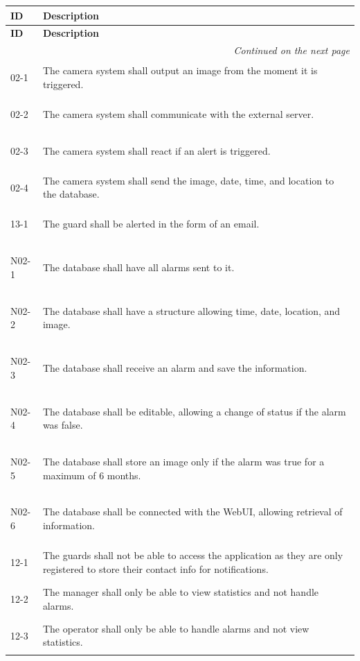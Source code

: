 \documentclass{article}
\begin{document}
\begin{longtable}{|l|p{15cm}|}
\hline
\textbf{ID} & \textbf{Description} \\
\hline
\endfirsthead

\hline
\textbf{ID} & \textbf{Description} \\
\hline
\endhead

\hline \multicolumn{2}{|r|}{\textit{Continued on the next page}} \\
\hline
\endfoot

\hline
\endlastfoot

\hypertarget{02-1}{02-1} & The camera system shall output an image from the moment it is triggered. \\
\hline
\hypertarget{02-2}{02-2} & The camera system shall communicate with the external server. \\
\hline
\hypertarget{02-3}{02-3} & The camera system shall react if an alert is triggered. \\
\hline
\hypertarget{02-4}{02-4} & The camera system shall send the image, date, time, and location to the database. \\
\hline
\hypertarget{13-1}{13-1} & The guard shall be alerted in the form of an email. \\
\hline
\hypertarget{N02-1}{N02-1} & The database shall have all alarms sent to it. \\
\hline
\hypertarget{N02-2}{N02-2} & The database shall have a structure allowing time, date, location, and image. \\
\hline
\hypertarget{N02-3}{N02-3} & The database shall receive an alarm and save the information. \\
\hline
\hypertarget{N02-4}{N02-4} & The database shall be editable, allowing a change of status if the alarm was false. \\
\hline
\hypertarget{N02-5}{N02-5} & The database shall store an image only if the alarm was true for a maximum of 6 months. \\
\hline
\hypertarget{N02-6}{N02-6} & The database shall be connected with the WebUI, allowing retrieval of information. \\
\hline
\hypertarget{12-1}{12-1} & The guards shall not be able to access the application as they are only registered to store their contact info for notifications. \\
\hline
\hypertarget{12-2}{12-2} & The manager shall only be able to view statistics and not handle alarms. \\
\hline
\hypertarget{12-3}{12-3} & The operator shall only be able to handle alarms and not view statistics. \\

\end{longtable}
\end{document}

